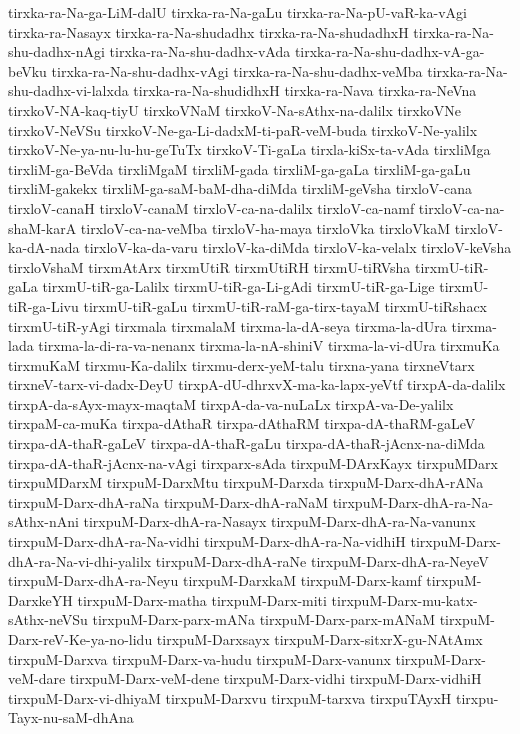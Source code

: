 {tirxka-ra-Na-ga-LiM-dalU
tirxka-ra-Na-gaLu
tirxka-ra-Na-pU-vaR-ka-vAgi
tirxka-ra-Nasayx
tirxka-ra-Na-shudadhx
tirxka-ra-Na-shudadhxH
tirxka-ra-Na-shu-dadhx-nAgi
tirxka-ra-Na-shu-dadhx-vAda
tirxka-ra-Na-shu-dadhx-vA-ga-beVku
tirxka-ra-Na-shu-dadhx-vAgi
tirxka-ra-Na-shu-dadhx-veMba
tirxka-ra-Na-shu-dadhx-vi-lalxda
tirxka-ra-Na-shudidhxH
tirxka-ra-Nava
tirxka-ra-NeVna
tirxkoV-NA-kaq-tiyU
tirxkoVNaM
tirxkoV-Na-sAthx-na-dalilx
tirxkoVNe
tirxkoV-NeVSu
tirxkoV-Ne-ga-Li-dadxM-ti-paR-veM-buda
tirxkoV-Ne-yalilx
tirxkoV-Ne-ya-nu-lu-hu-geTuTx
tirxkoV-Ti-gaLa
tirxla-kiSx-ta-vAda
tirxliMga
tirxliM-ga-BeVda
tirxliMgaM
tirxliM-gada
tirxliM-ga-gaLa
tirxliM-ga-gaLu
tirxliM-gakekx
tirxliM-ga-saM-baM-dha-diMda
tirxliM-geVsha
tirxloV-cana
tirxloV-canaH
tirxloV-canaM
tirxloV-ca-na-dalilx
tirxloV-ca-namf
tirxloV-ca-na-shaM-karA
tirxloV-ca-na-veMba
tirxloV-ha-maya
tirxloVka
tirxloVkaM
tirxloV-ka-dA-nada
tirxloV-ka-da-varu
tirxloV-ka-diMda
tirxloV-ka-velalx
tirxloV-keVsha
tirxloVshaM
tirxmAtArx
tirxmUtiR
tirxmUtiRH
tirxmU-tiRVsha
tirxmU-tiR-gaLa
tirxmU-tiR-ga-Lalilx
tirxmU-tiR-ga-Li-gAdi
tirxmU-tiR-ga-Lige
tirxmU-tiR-ga-Livu
tirxmU-tiR-gaLu
tirxmU-tiR-raM-ga-tirx-tayaM
tirxmU-tiRshacx
tirxmU-tiR-yAgi
tirxmala
tirxmalaM
tirxma-la-dA-seya
tirxma-la-dUra
tirxma-lada
tirxma-la-di-ra-va-nenanx
tirxma-la-nA-shiniV
tirxma-la-vi-dUra
tirxmuKa
tirxmuKaM
tirxmu-Ka-dalilx
tirxmu-derx-yeM-talu
tirxna-yana
tirxneVtarx
tirxneV-tarx-vi-dadx-DeyU
tirxpA-dU-dhrxvX-ma-ka-lapx-yeVtf
tirxpA-da-dalilx
tirxpA-da-sAyx-mayx-maqtaM
tirxpA-da-va-nuLaLx
tirxpA-va-De-yalilx
tirxpaM-ca-muKa
tirxpa-dAthaR
tirxpa-dAthaRM
tirxpa-dA-thaRM-gaLeV
tirxpa-dA-thaR-gaLeV
tirxpa-dA-thaR-gaLu
tirxpa-dA-thaR-jAcnx-na-diMda
tirxpa-dA-thaR-jAcnx-na-vAgi
tirxparx-sAda
tirxpuM-DArxKayx
tirxpuMDarx
tirxpuMDarxM
tirxpuM-DarxMtu
tirxpuM-Darxda
tirxpuM-Darx-dhA-rANa
tirxpuM-Darx-dhA-raNa
tirxpuM-Darx-dhA-raNaM
tirxpuM-Darx-dhA-ra-Na-sAthx-nAni
tirxpuM-Darx-dhA-ra-Nasayx
tirxpuM-Darx-dhA-ra-Na-vanunx
tirxpuM-Darx-dhA-ra-Na-vidhi
tirxpuM-Darx-dhA-ra-Na-vidhiH
tirxpuM-Darx-dhA-ra-Na-vi-dhi-yalilx
tirxpuM-Darx-dhA-raNe
tirxpuM-Darx-dhA-ra-NeyeV
tirxpuM-Darx-dhA-ra-Neyu
tirxpuM-DarxkaM
tirxpuM-Darx-kamf
tirxpuM-DarxkeYH
tirxpuM-Darx-matha
tirxpuM-Darx-miti
tirxpuM-Darx-mu-katx-sAthx-neVSu
tirxpuM-Darx-parx-mANa
tirxpuM-Darx-parx-mANaM
tirxpuM-Darx-reV-Ke-ya-no-lidu
tirxpuM-Darxsayx
tirxpuM-Darx-sitxrX-gu-NAtAmx
tirxpuM-Darxva
tirxpuM-Darx-va-hudu
tirxpuM-Darx-vanunx
tirxpuM-Darx-veM-dare
tirxpuM-Darx-veM-dene
tirxpuM-Darx-vidhi
tirxpuM-Darx-vidhiH
tirxpuM-Darx-vi-dhiyaM
tirxpuM-Darxvu
tirxpuM-tarxva
tirxpuTAyxH
tirxpu-Tayx-nu-saM-dhAna
}

